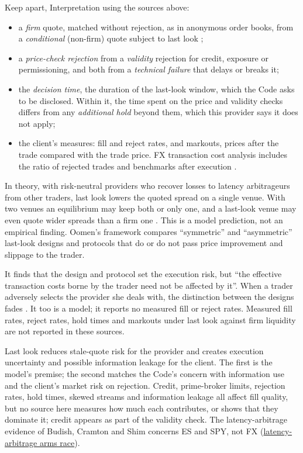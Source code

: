 \begin{qfmechanism}
 Keep apart, Interpretation using the sources above:
\begin{itemize}
\item a \emph{firm} quote, matched without rejection, as in anonymous order books, from a \emph{conditional} (non-firm) quote subject to last look \citep[Box~D, p.~23]{exp-fx-algos};
\item a \emph{price-check rejection} from a \emph{validity} rejection for credit, exposure or permissioning, and both from a \emph{technical failure} that delays or breaks it;
\item the \emph{decision time}, the duration of the last-look window, which the Code asks to be disclosed. Within it, the time spent on the price and validity checks differs from any \emph{additional hold} beyond them, which this provider says it does not apply;
\item the client's measures: fill and reject rates, and markouts, prices after the trade compared with the trade price. FX transaction cost analysis includes the ratio of rejected trades and benchmarks after execution \citep[Box~B, p.~11]{exp-fx-algos}.
\end{itemize}
In theory, with risk-neutral providers who recover losses to latency arbitrageurs from other traders, last look lowers the quoted spread on a single venue. With two venues an equilibrium may keep both or only one, and a last-look venue may even quote wider spreads than a firm one \citep[arXiv version, abstract]{dm-cartea-jaimungal-walton-2019}. This is a model prediction, not an empirical finding. Oomen's framework compares ``symmetric'' and ``asymmetric'' last-look designs and protocols that do or do not pass price improvement and slippage to the trader.

It finds that the design and protocol set the execution risk, but ``the effective transaction costs borne by the trader need not be affected by it''. When a trader adversely selects the provider she deals with, the distinction between the designs fades \citep[accepted version, abstract]{oomen-2017-lastlook}. It too is a model; it reports no measured fill or reject rates. Measured fill rates, reject rates, hold times and markouts under last look against firm liquidity are not reported in these sources.

 Last look reduces stale-quote risk for the provider and creates execution uncertainty and possible information leakage for the client. The first is the model's premise; the second matches the Code's concern with information use and the client's market risk on rejection. Credit, prime-broker limits, rejection rates, hold times, skewed streams and information leakage all affect fill quality, but no source here measures how much each contributes, or shows that they dominate it; credit appears as part of the validity check. The latency-arbitrage evidence of Budish, Cramton and Shim concerns ES and SPY, not FX (\hyperref[res:latency-arbitrage-arms-race]{latency-arbitrage arms race}).


\end{qfmechanism}
